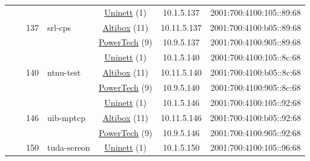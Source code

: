 \begin{small}
\begin{center}
\begin{longtable}{|c|c|c|c|c|c|c|c|}
  &  & \multirow{3}{*}{\tiny{137}} & \multicolumn{1}{|l|}{\multirow{3}{*}{\tiny{srl-cps}}} & \multicolumn{2}{|c|}{\tiny{\href{https://www.uninett.no}{Uninett} (1)}} & \tiny{10.1.5.137} & \tiny{2001:700:4100:105::89:68} \\* \cline{5-5}\cline{6-6}\cline{7-7}\cline{8-8}
  &  &  &  & \multicolumn{2}{|c|}{\tiny{\href{https://www.altibox.no}{Altibox} (11)}} & \tiny{10.11.5.137} & \tiny{2001:700:4100:b05::89:68} \\* \cline{5-5}\cline{6-6}\cline{7-7}\cline{8-8}
  &  &  &  & \multicolumn{2}{|c|}{\tiny{\href{http://www.powertech.no}{PowerTech} (9)}} & \tiny{10.9.5.137} & \tiny{2001:700:4100:905::89:68} \\* \cline{3-3}\cline{4-4}\cline{5-5}\cline{6-6}\cline{7-7}\cline{8-8}
  &  & \multirow{3}{*}{\tiny{140}} & \multicolumn{1}{|l|}{\multirow{3}{*}{\tiny{ntnu-test}}} & \multicolumn{2}{|c|}{\tiny{\href{https://www.uninett.no}{Uninett} (1)}} & \tiny{10.1.5.140} & \tiny{2001:700:4100:105::8c:68} \\* \cline{5-5}\cline{6-6}\cline{7-7}\cline{8-8}
  &  &  &  & \multicolumn{2}{|c|}{\tiny{\href{https://www.altibox.no}{Altibox} (11)}} & \tiny{10.11.5.140} & \tiny{2001:700:4100:b05::8c:68} \\* \cline{5-5}\cline{6-6}\cline{7-7}\cline{8-8}
  &  &  &  & \multicolumn{2}{|c|}{\tiny{\href{http://www.powertech.no}{PowerTech} (9)}} & \tiny{10.9.5.140} & \tiny{2001:700:4100:905::8c:68} \\* \cline{3-3}\cline{4-4}\cline{5-5}\cline{6-6}\cline{7-7}\cline{8-8}
  &  & \multirow{3}{*}{\tiny{146}} & \multicolumn{1}{|l|}{\multirow{3}{*}{\tiny{uib-mptcp}}} & \multicolumn{2}{|c|}{\tiny{\href{https://www.uninett.no}{Uninett} (1)}} & \tiny{10.1.5.146} & \tiny{2001:700:4100:105::92:68} \\* \cline{5-5}\cline{6-6}\cline{7-7}\cline{8-8}
  &  &  &  & \multicolumn{2}{|c|}{\tiny{\href{https://www.altibox.no}{Altibox} (11)}} & \tiny{10.11.5.146} & \tiny{2001:700:4100:b05::92:68} \\* \cline{5-5}\cline{6-6}\cline{7-7}\cline{8-8}
  &  &  &  & \multicolumn{2}{|c|}{\tiny{\href{http://www.powertech.no}{PowerTech} (9)}} & \tiny{10.9.5.146} & \tiny{2001:700:4100:905::92:68} \\* \cline{3-3}\cline{4-4}\cline{5-5}\cline{6-6}\cline{7-7}\cline{8-8}
  &  & \multirow{3}{*}{\tiny{150}} & \multicolumn{1}{|l|}{\multirow{3}{*}{\tiny{tuda-sereon}}} & \multicolumn{2}{|c|}{\tiny{\href{https://www.uninett.no}{Uninett} (1)}} & \tiny{10.1.5.150} & \tiny{2001:700:4100:105::96:68} \\* \cline{5-5}\cline{6-6}\cline{7-7}\cline{8-8}

\end{longtable}
\end{center}
\end{small}
